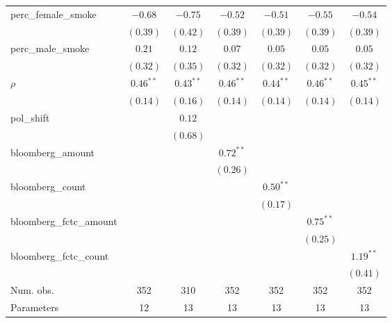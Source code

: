 \begin{table}[!h]
\begin{center}
\begin{tabular}{l c c c c c c }
perc\_female\_smoke     & $-0.68$     & $-0.75$     & $-0.52$     & $-0.51$     & $-0.55$     & $-0.54$     \\
                        & $(0.39)$    & $(0.42)$    & $(0.39)$    & $(0.39)$    & $(0.39)$    & $(0.39)$    \\
perc\_male\_smoke       & $0.21$      & $0.12$      & $0.07$      & $0.05$      & $0.05$      & $0.05$      \\
                        & $(0.32)$    & $(0.35)$    & $(0.32)$    & $(0.32)$    & $(0.32)$    & $(0.32)$    \\
$\rho$                  & $0.46^{**}$ & $0.43^{**}$ & $0.46^{**}$ & $0.44^{**}$ & $0.46^{**}$ & $0.45^{**}$ \\
                        & $(0.14)$    & $(0.16)$    & $(0.14)$    & $(0.14)$    & $(0.14)$    & $(0.14)$    \\
pol\_shift              &             & $0.12$      &             &             &             &             \\
                        &             & $(0.68)$    &             &             &             &             \\
bloomberg\_amount       &             &             & $0.72^{**}$ &             &             &             \\
                        &             &             & $(0.26)$    &             &             &             \\
bloomberg\_count        &             &             &             & $0.50^{**}$ &             &             \\
                        &             &             &             & $(0.17)$    &             &             \\
bloomberg\_fctc\_amount &             &             &             &             & $0.75^{**}$ &             \\
                        &             &             &             &             & $(0.25)$    &             \\
bloomberg\_fctc\_count  &             &             &             &             &             & $1.19^{**}$ \\
                        &             &             &             &             &             & $(0.41)$    \\
\midrule
Num. obs.               & 352         & 310         & 352         & 352         & 352         & 352         \\
Parameters              & 12          & 13          & 13          & 13          & 13          & 13          \\

\end{tabular}
\end{center}
\end{table}
